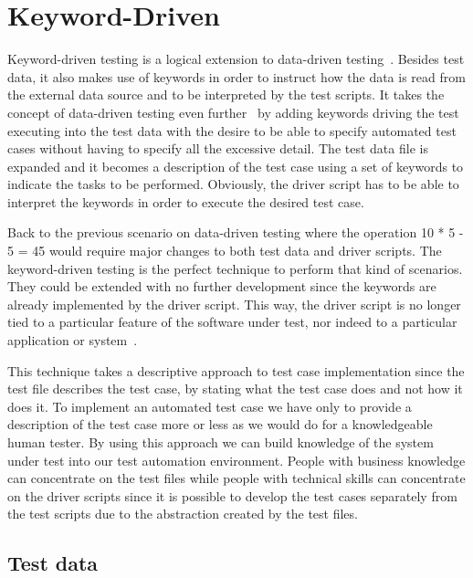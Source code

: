 \section{Keyword-Driven}

Keyword-driven testing is a logical extension to data-driven testing~\cite{Fewster99}.
Besides test data, it also makes use of keywords in order to instruct how the
data is read from the external data source and to be interpreted by the test
scripts. It takes the concept of data-driven testing even further~\cite{Lau07}
by adding keywords driving the test executing into the test data with the desire
to be able to specify automated test cases without having to specify all the
excessive detail. The test data file is expanded and it becomes a description of
the test case using a set of keywords to indicate the tasks to be performed.
Obviously, the driver script has to be able to interpret the keywords in order
to execute the desired test case.

Back to the previous scenario on data-driven testing where the operation
10 * 5 - 5 = 45 would require major changes to both test data and driver
scripts. The keyword-driven testing is the perfect technique to perform that
kind of scenarios. They could be extended with no further development since the
keywords are already implemented by the driver script. This way, the driver
script is no longer tied to a particular feature of the software under test,
nor indeed to a particular application or system~\cite{Fewster99}.

This technique takes a descriptive approach to test case implementation since
the test file describes the test case, by stating what the test case does and
not how it does it. To implement an automated test case we have only to provide
a description of the test case more or less as we would do for a knowledgeable
human tester. By using this approach we can build knowledge of the system under
test into our test automation environment. People with business knowledge can
concentrate on the test files while people with technical skills can concentrate
on the driver scripts since it is possible to develop the test cases separately
from the test scripts due to the abstraction created by the test files.

\subsection{Test data}

